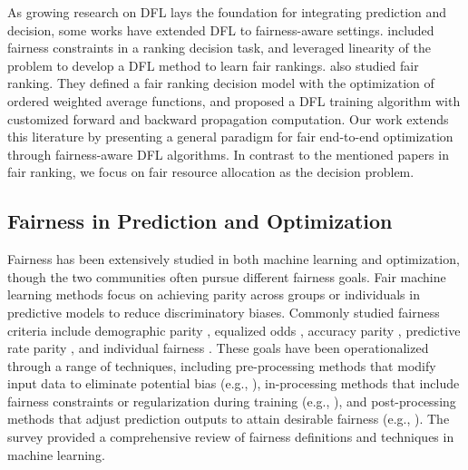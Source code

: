 \documentclass[ijoc,sglanonrev]{informs4}
\begin{document}

As growing research on DFL lays the foundation for integrating prediction and decision, some works have extended DFL to fairness-aware settings. \citet{kotary2022end} included fairness constraints in a ranking decision task, and leveraged linearity of the problem to develop a DFL method to learn fair rankings. \citet{dinh2024learning} also studied fair ranking. They defined a fair ranking decision model with the optimization of ordered weighted average functions, and proposed a DFL training algorithm with customized forward and backward propagation computation. Our work extends this literature by presenting a general paradigm for fair end-to-end optimization through fairness-aware DFL algorithms. In contrast to the mentioned papers in fair ranking, we focus on fair resource allocation as the decision problem. 


\subsection{Fairness in Prediction and Optimization}
Fairness has been extensively studied in both machine learning and optimization, though the two communities often pursue different fairness goals. Fair machine learning methods focus on achieving parity across groups or individuals in predictive models to reduce discriminatory biases. Commonly studied fairness criteria include demographic parity \citep{dwork2012fairness}, equalized odds \citep{hardt2016equality}, accuracy parity \citep{berk2021fairness}, predictive rate parity \citep{kleinberg2016inherent} , and individual fairness \citep{dwork2012fairness}. These goals have been operationalized through a range of techniques, including pre-processing methods that modify input data to eliminate potential bias (e.g., \cite{zemel2013learning, calmon2017optimized}), in-processing methods that include fairness constraints or regularization during training  (e.g., \cite{zafar2019fairness, olfat2018spectral, donini2018empirical}), and post-processing methods that adjust prediction outputs to attain desirable fairness (e.g., \cite{hardt2016equality, alabdulmohsin2020fair}). 
The survey \cite{mehrabi2021survey} provided a comprehensive review of fairness definitions and techniques in machine learning.
\end{document}
